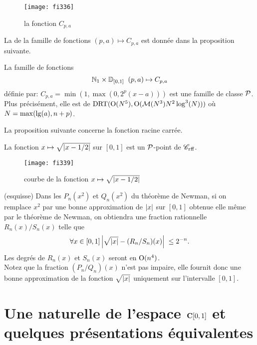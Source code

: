 \begin{figure}[htbp]  
\begin{center}
\texttt{[image: fi336]}
\end{center}
\caption[Courbe représentative de la fonction $C_{p,a}$]{\label{ffi336}  
la fonction $C_{p,a}$}  
\end{figure}  

\noindent    
La \com de la famille de fonctions  $(p,a) \mapsto C_{p,a}$  est donnée dans la 
proposition suivante.

\begin{fproposition} \label{f336}
La famille de fonctions   
\[
\mathbb {N}_1 \times \mathbb {D}_{[0,1]} \; \; (p,a) \mapsto C_{p,a}
\]
définie par:
$
 C_{p,a} = \min(1,\max(0, 2^p(x - a)))
$  
est une famille de classe ${\cal P}$. 
Plus précisément, elle est de \com  
${\rm DRT}({\rm O}(N^5), {\rm O}({{{\cal M}}}(N^3) N^2 \log^3(N)))$   où  $N = \max({\rm lg}(a), n+p)$.
\end{fproposition}

La proposition suivante concerne la fonction racine carrée.

\begin{fproposition} \label{f337}
La fonction  $ x \mapsto \sqrt {\left|{ x - 1/2 }\right|} $  sur $[0,1]$   est un  
${\cal P}$-point de  ${{{\mathscr C}}_{\rm rff}}$.
\end{fproposition}
\begin{figure}[htbp]  
\begin{center}
\texttt{[image: fi339]}
\end{center}
\caption[Courbe de la fonction $\sqrt {\abs{ x - 1/2 }} $]{\label{ffi339}  
courbe de la fonction $ x \mapsto \sqrt {\left|{ x - 1/2}\right|} $}  
\end{figure}  

\proof (esquisse) 
Dans les \pols  $P_n(x^2)$ et $Q_n(x^2)$  du théorème de Newman, si on 
remplace  $x^2$  par une bonne approximation de $\left|{x}\right|$ sur  $[0,1]$  
obtenue elle même par le théorème de Newman, on obtiendra une fraction 
rationnelle  $R_n(x)/S_n(x)$  telle que 
\[
\forall x \in [0,1] \left|{\sqrt{ \left|{x}\right|} - (R_n/S_n)(x) }\right|\;  \leq 2^{-
n}.
\]
Les degrés de  $R_n(x)$  et  $S_n(x)$  seront en  ${\rm O}(n^4)$. \\  
Notez que la fraction  $(P_n/Q_n)(x)$  n'est pas impaire, elle fournit donc une 
bonne approximation de la fonction  $\sqrt{ \left|{x}\right|}$  uniquement sur 
l'intervalle $[0,1]$.
\eop

\section[Une \pres naturelle de l'espace \texorpdfstring{$\czu$}{C[0,1]}]{Une \pres naturelle de l'espace \texorpdfstring{$\czu$}{C[0,1]} 
et quelques présentations 
équivalentes}\label{fsec4}

